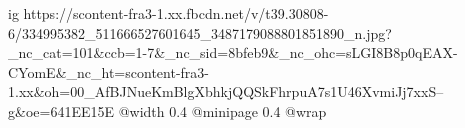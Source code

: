  
 
 
 
 

\ifcmt
  ig https://scontent-fra3-1.xx.fbcdn.net/v/t39.30808-6/334995382_511666527601645_3487179088801851890_n.jpg?_nc_cat=101&ccb=1-7&_nc_sid=8bfeb9&_nc_ohc=sLGI8B8p0qEAX-CYomE&_nc_ht=scontent-fra3-1.xx&oh=00_AfBJNueKmBlgXbhkjQQSkFhrpuA7s1U46XvmiJj7xxS--g&oe=641EE15E
  @width 0.4
  @minipage 0.4
  @wrap \parpic[r]
\fi
